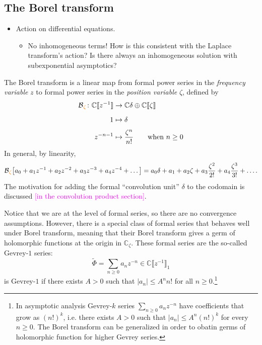 \documentclass{article}
\theoremstyle{definition}
\newcommand{\maps}{\colon}
\newcommand{\C}{\mathbb{C}}
\newcommand{\borel}{\mathcal{B}}
\begin{document}
\subsection{The Borel transform}
\color{gray}
\begin{itemize}
\item Action on differential equations.
\begin{itemize}
\item No inhomogeneous terms! How is this consistent with the Laplace transform's action? Is there always an inhomogeneous solution with subexponential asymptotics?
\end{itemize}
\end{itemize}
\color{black}
The Borel transform is a linear map from formal power series in the {\em frequency variable} $z$ to formal power series in the {\em position variable} $\zeta$, defined by
\begin{align*}
\borel\textcolor{orange}{_\zeta} \maps \C \llbracket z^{-1} \rrbracket & \to \C\delta \oplus \C \llbracket \zeta \rrbracket \\
1 & \mapsto \delta\vphantom{\frac{1}{1}} \\
z^{-n-1} & \mapsto \frac{\zeta^n}{n!}\qquad\text{when } n \ge 0
\end{align*}
In general, by linearity,
\begin{align*}
\borel\textcolor{orange}{_\zeta}\big[a_0 + a_1 z^{-1} + a_2 z^{-2} + a_3 z^{-3} + a_4 z^{-4} + \ldots \big] = a_0\delta + a_1 + a_2 \zeta + a_3 \frac{\zeta^2}{2!} + a_4 \frac{\zeta^3}{3!} + \ldots.
\end{align*}
The motivation for adding the formal ``convolution unit'' $\delta$ to the codomain is discussed \textcolor{magenta}{[in the convolution product section]}.

Notice that we are at the level of formal series, so there are no convergence assumptions. However, there is a special class of formal series that behaves well under Borel transform, meaning that their Borel transform gives a germ of holomorphic functions at the origin in $\C_{\zeta}$. These formal series are the so-called Gevrey-$1$ series:
\[\tilde{\Phi}=\sum_{n\geq 0}a_nz^{-n}\in\C \llbracket z^{-1} \rrbracket_1\]
is Gevrey-$1$ if there exists $A>0$ such that $|a_n|\leq A^n n!$ for all $n\geq 0$.\footnote{In asymptotic analysis Gevrey-$k$ series $\sum_{n\geq 0}a_nz^{-n}$ have coefficients that grow as $(n!)^{k}$, i.e. there exists $A>0$ such that $|a_n|\leq A^n (n!)^k$ for every $n\geq 0$. The Borel transform can be generalized in order to obatin germs of holomorphic function for higher Gevrey series. }  
\end{document}
